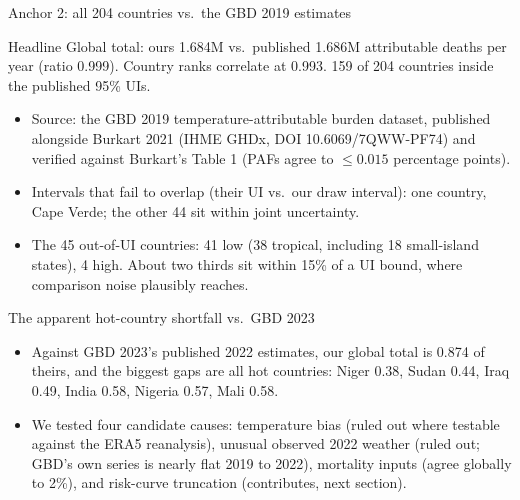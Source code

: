 \documentclass[aspectratio=169,11pt]{beamer}
\begin{document}
\begin{frame}{Anchor 2: all 204 countries vs.\ the GBD 2019 estimates}
  \begin{exampleblock}{Headline}
    Global total: ours 1.684M vs.\ published 1.686M attributable deaths per
    year (ratio 0.999). Country ranks correlate at 0.993. 159 of 204
    countries inside the published 95\% UIs.
  \end{exampleblock}
  \begin{itemize}
    \item Source: the GBD 2019 temperature-attributable burden dataset,
      published alongside Burkart 2021 (IHME GHDx, DOI 10.6069/7QWW-PF74)
      and verified against Burkart's Table 1 (PAFs agree to \(\le 0.015\)
      percentage points).
    \item Intervals that fail to overlap (their UI vs.\ our draw interval):
      one country, Cape Verde; the other 44 sit within joint uncertainty.
    \item The 45 out-of-UI countries: 41 low (38 tropical, including 18
      small-island states), 4 high. About two thirds sit within 15\% of a UI
      bound, where comparison noise plausibly reaches.
  \end{itemize}
\end{frame}

\begin{frame}{The apparent hot-country shortfall vs.\ GBD 2023}
  \begin{itemize}
    \item Against GBD 2023's published 2022 estimates, our
      global total is 0.874 of theirs, and the biggest gaps are all hot
      countries: Niger 0.38, Sudan 0.44, Iraq 0.49, India 0.58, Nigeria
      0.57, Mali 0.58.
    \item We tested four candidate causes: temperature bias (ruled out where
      testable against the ERA5 reanalysis), unusual observed 2022 weather
      (ruled out; GBD's own series is nearly flat 2019 to 2022), mortality
      inputs (agree globally to 2\%), and risk-curve truncation
      (contributes, next section).
  \end{itemize}
\end{frame}
\end{document}
